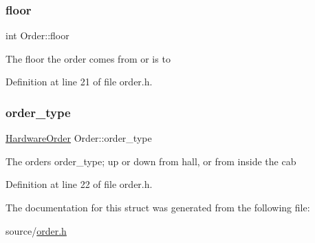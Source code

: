\subsubsection{\texorpdfstring{floor}{floor}}
{\footnotesize\ttfamily int Order\+::floor}

The floor the order comes from or is to 

Definition at line 21 of file order.\+h.

\mbox{\label{structOrder_aeddebdba3b07c66358921945e8710825}} 
\subsubsection{\texorpdfstring{order\+\_\+type}{order\_type}}
{\footnotesize\ttfamily \hyperlink{hardware_8h_a796a8de8ce0ae769d7dbd3327a7bdbe7}{Hardware\+Order} Order\+::order\+\_\+type}

The order\textquotesingle{}s order\+\_\+type; up or down from hall, or from inside the cab 

Definition at line 22 of file order.\+h.



The documentation for this struct was generated from the following file\+:\begin{DoxyCompactItemize}
\item 
source/\hyperlink{order_8h}{order.\+h}\end{DoxyCompactItemize}
